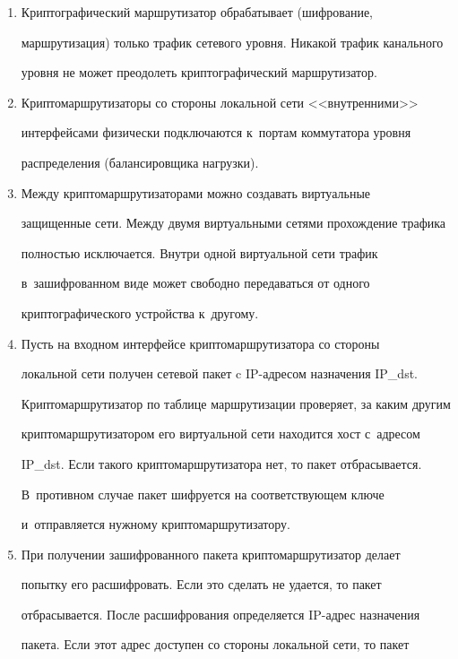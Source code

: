   \begin{enumerate}[1.]


\item Криптографический маршрутизатор обрабатывает (шифрование, 


маршрутизация) только трафик сетевого уровня. Никакой трафик канального 


уровня не может преодолеть криптографический маршрутизатор.


\item Криптомаршрутизаторы со стороны локальной сети <<внутренними>> 


интерфейсами физически подключаются к~портам коммутатора уровня 


распределения (балансировщика нагрузки).


\item Между криптомаршрутизаторами можно создавать виртуальные 


защищенные сети. Между двумя виртуальными сетями прохождение трафика 


пол\-ностью исключается. Внутри одной виртуальной сети трафик 


в~зашифрованном виде может свободно передаваться от одного 


криптографического устройства к~другому.


\item Пусть на входном интерфейсе криптомаршрутизатора со стороны 


локальной сети получен сетевой пакет c IP-ад\-ре\-сом назначения IP\_dst. 


Криптомаршрутизатор по таблице маршрутизации проверяет, за каким другим 


криптомаршрутизатором его виртуальной сети находится хост с~адресом 


IP\_dst. Если такого криптомаршрутизатора нет, то пакет отбрасывается. 


В~противном случае пакет шифруется на соответствующем ключе 


и~отправляется нужному криптомаршрутизатору.


\item При получении зашифрованного пакета криптомаршрутизатор делает 


попытку его расшифровать. Если это сделать не удается, то пакет 


отбрасывается. После расшифрования определяется IP-ад\-рес назначения 


пакета. Если этот адрес доступен со стороны локальной сети, то пакет 



\end{enumerate}
